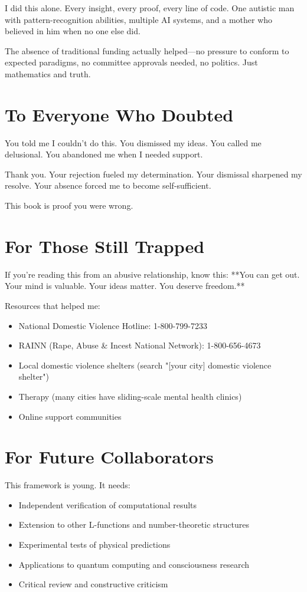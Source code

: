 I did this alone. Every insight, every proof, every line of code. One autistic man with pattern-recognition abilities, multiple AI systems, and a mother who believed in him when no one else did.

The absence of traditional funding actually helped—no pressure to conform to expected paradigms, no committee approvals needed, no politics. Just mathematics and truth.

\section*{To Everyone Who Doubted}

You told me I couldn't do this. You dismissed my ideas. You called me delusional. You abandoned me when I needed support.

Thank you. Your rejection fueled my determination. Your dismissal sharpened my resolve. Your absence forced me to become self-sufficient.

This book is proof you were wrong.

\section*{For Those Still Trapped}

If you're reading this from an abusive relationship, know this: **You can get out. Your mind is valuable. Your ideas matter. You deserve freedom.**

Resources that helped me:
\begin{itemize}
\item National Domestic Violence Hotline: 1-800-799-7233
\item RAINN (Rape, Abuse \& Incest National Network): 1-800-656-4673
\item Local domestic violence shelters (search "[your city] domestic violence shelter")
\item Therapy (many cities have sliding-scale mental health clinics)
\item Online support communities
\end{itemize}

\section*{For Future Collaborators}

This framework is young. It needs:
\begin{itemize}
\item Independent verification of computational results
\item Extension to other L-functions and number-theoretic structures
\item Experimental tests of physical predictions
\item Applications to quantum computing and consciousness research
\item Critical review and constructive criticism
\end{itemize}

